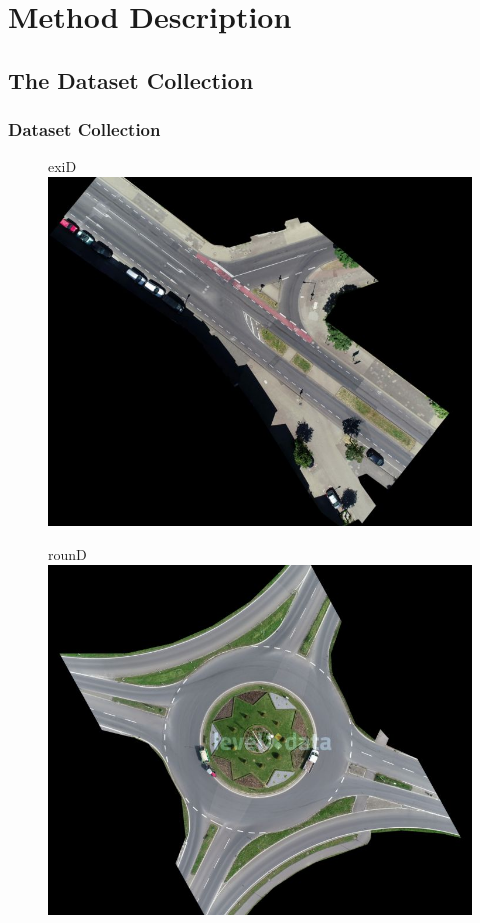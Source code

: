 
\section{Method Description}

\subsection{The Dataset Collection}
\begin{frame}
  \frametitle{Dataset Collection}
  \begin{figure}[!t]
    \centering
    \begin{minipage}[h]{0.32\linewidth}
        \begin{block}{exiD}
            \centering
            \includegraphics[width=\textwidth]{figures/pictures_first_part/inD.jpeg}
        \end{block}
    \end{minipage}
    \begin{minipage}[h]{0.32\linewidth}
        \begin{block}{rounD}
            \centering
            \includegraphics[width=\textwidth]{figures/pictures_first_part/rounD.jpeg}

\end{block}
\end{minipage}
\end{figure}
\end{frame}
